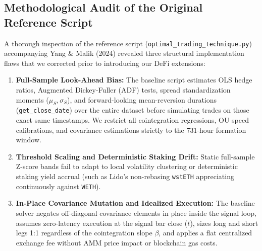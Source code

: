 \documentclass[11pt,a4paper]{article}
\begin{document}
\subsection{Methodological Audit of the Original Reference Script}
A thorough inspection of the reference script (\texttt{optimal\_trading\_technique.py}) accompanying Yang \& Malik (2024) revealed three structural implementation flaws that we corrected prior to introducing our DeFi extensions:
\begin{enumerate}[noitemsep,topsep=2pt,leftmargin=1.5em]
\item \textbf{Full-Sample Look-Ahead Bias:} The baseline script estimates OLS hedge ratios, Augmented Dickey-Fuller (ADF) tests, spread standardization moments ($\mu_S, \sigma_S$), and forward-looking mean-reversion durations (\texttt{get\_close\_date}) over the entire dataset before simulating trades on those exact same timestamps. We restrict all cointegration regressions, OU speed calibrations, and covariance estimations strictly to the $731$-hour formation window.
\item \textbf{Threshold Scaling and Deterministic Staking Drift:} Static full-sample Z-score bands fail to adapt to local volatility clustering or deterministic staking yield accrual (such as Lido's non-rebasing \texttt{wstETH} appreciating continuously against \texttt{WETH}).
\item \textbf{In-Place Covariance Mutation and Idealized Execution:} The baseline solver negates off-diagonal covariance elements in place inside the signal loop, assumes zero-latency execution at the signal bar close ($t$), sizes long and short legs 1:1 regardless of the cointegration slope $\beta$, and applies a flat centralized exchange fee without AMM price impact or blockchain gas costs.
\end{enumerate}
\end{document}
